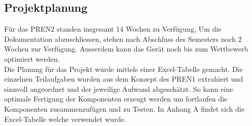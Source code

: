 \subsection{Projektplanung}
Für das PREN2 standen insgesamt 14 Wochen zu Verfügung, Um die Dokumentation 
abzuschliessen, stehen nach Abschluss des Semesters noch 2 Wochen zur 
Verfügung. Ausserdem kann das Gerät noch bis zum Wettbewerb optimiert werden. \\
Die Planung für das Projekt wurde mittels einer Excel-Tabelle gemacht. Die 
einzelnen Teilaufgaben wurden aus dem Konzept des PREN1 extrahiert und 
sinnvoll angeordnet und der jeweilige Aufwand abgeschätzt. So kann eine 
optimale Fertigung der Komponenten erzeugt werden um fortlaufen die 
Komponenten zusammenzufügen und zu Testen. In Anhang 
A
findet sich die Excel-Tabelle welche verwendet wurde.



